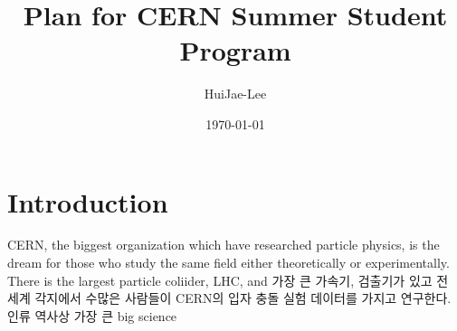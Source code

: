 \documentclass[aps,superscriptaddress,10pt]{revtex4-2}
\begin{document}
\title{Plan for CERN Summer Student Program}

\author{HuiJae-Lee}


\date{\today}

 \maketitle
 
\section{Introduction}
CERN, the biggest organization which have researched particle physics, is 
the dream for those who study the same field either theoretically or 
experimentally. There is the largest particle coliider, LHC, and 
가장 큰 가속기, 검출기가 있고 전 세계 각지에서 수많은 사람들이
CERN의 입자 충돌 실험 데이터를 가지고 연구한다. 인류 역사상 가장 큰
big science 





\vfill
\end{document}
